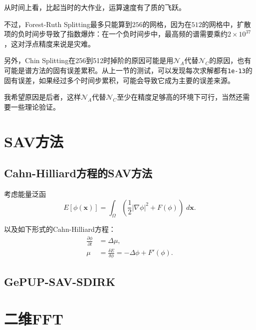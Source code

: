 \documentclass[lang=cn,10pt,bibend=bibtex]{elegantbook}
\begin{document}
从时间上看，比起当时的大作业，运算速度有了质的飞跃。

不过，Forest-Ruth Splitting最多只能算到$256$的网格，因为在$512$的网格中，扩散项的负时间步导致了指数爆炸：在一个负时间步中，最高频的谱需要乘约$2\times 10^{37}$，这对浮点精度来说是灾难。

另外，Chin Splitting在256到512时掉阶的原因可能是用$\mathcal{N}_A$代替$\mathcal{N}_C$的原因，也有可能是谱方法的固有误差累积。从上一节的测试，可以发现每次求解都有\verb|1e-13|的固有误差，如果经过多个时间步累积，可能会导致它成为主要的误差来源。

我希望原因是后者，这样$\mathcal{N}_A$代替$\mathcal{N}_C$至少在精度足够高的环境下可行，当然还需要一些理论验证。

\vspace{5em}

\chapter{SAV方法}

\section{Cahn-Hilliard方程的SAV方法}

考虑能量泛函
\begin{equation}
    E[\phi(\mathbf{x})]=\int_\Omega\left(\frac{1}{2}|\nabla \phi|^2+F(\phi)\right)\;d\mathbf{x}.
\end{equation}

以及如下形式的Cahn-Hilliard方程：
\begin{align}
    \frac{\partial \phi}{\partial t}&=\Delta\mu,\\
    \mu&=\frac{\delta E}{\delta\phi}=-\Delta \phi+F'(\phi).
\end{align}

\section{GePUP-SAV-SDIRK}

\vspace{5em}

\printbibliography[heading=bibintoc,title=\ebibname]

\appendix

\newpage

\chapter{二维FFT}
\end{document}
